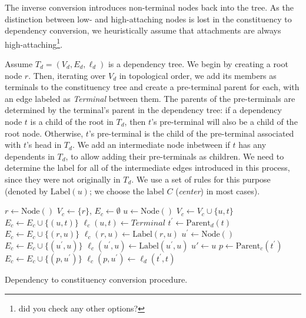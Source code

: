 \documentclass[11pt]{article}
\newcommand{\oa}[1]{\footnote{\color{red} #1}}
\begin{document}
The inverse conversion introduces non-terminal nodes back into the tree.
As the distinction
between low- and high-attaching nodes is lost in the constituency to
dependency conversion,
we heuristically assume that attachments are always
high-attaching\oa{did you check any other options?}.

Assume $T_d=(V_d,E_d,\ell_d)$ is a dependency tree.
We begin by creating a root node $r$.
Then, iterating over $V_d$ in topological order,
we add its members as terminals to the constituency tree
and create a pre-terminal parent for each,
with an edge labeled as \textit{Terminal} between them.
The parents of the pre-terminals are determined by the terminal's parent in the dependency
tree: if a dependency node $t$ is a child of the root in $T_d$, then $t$'s pre-terminal will also be a child of the root node. Otherwise, $t$'s pre-terminal is the child of the pre-terminal associated with $t$'s head in $T_d$. We add an intermediate node inbetween if $t$ has any dependents in $T_d$, to allow adding their pre-terminals as children.
We need to determine the label for all of the intermediate edges introduced in this process, since they were not originally in $T_d$. We use a set of rules for this purpose (denoted by $\mathrm{Label}(u)$; we choose the label $C$ (\textit{center}) in most cases).

\begin{algorithm}
 $r \leftarrow \mathrm{Node()}$\;
 $V_c \leftarrow \{r\}$,
 $E_c \leftarrow \emptyset$\;
  {
  $u \leftarrow \mathrm{Node()}$\;
  $V_c \leftarrow V_c \cup \{u, t\}$\;
  $E_c \leftarrow E_c \cup \{(u, t)\}$\;
  $\ell_c(u,t)\leftarrow\mathit{Terminal}$\;
  $t^\prime \leftarrow \mathrm{Parent}_d(t)$\;
   {
   $E_c \leftarrow E_c \cup \{(r, u)\}$\;
   $\ell_c(r, u) \leftarrow \mathrm{Label}(r,u)$\;
  } {
    {
    $u^\prime \leftarrow \mathrm{Node()}$\;
    $E_c \leftarrow E_c \cup \{(u^\prime, u)\}$\;
    $\ell_c(u^\prime, u) \leftarrow \mathrm{Label}(u^\prime, u)$\;
   } {
    $u' \leftarrow u$\;
   }
   $p \leftarrow \mathrm{Parent}_c(t^\prime)$\;
   $E_c \leftarrow E_c \cup \{(p, u^\prime)\}$\;
   $\ell_c(p, u^\prime) \leftarrow \ell_d(t^\prime, t)$\;
  }
 }
 \caption{Dependency to constituency conversion procedure.}
 \label{alg:dep2con}
\end{algorithm}


\end{document}
